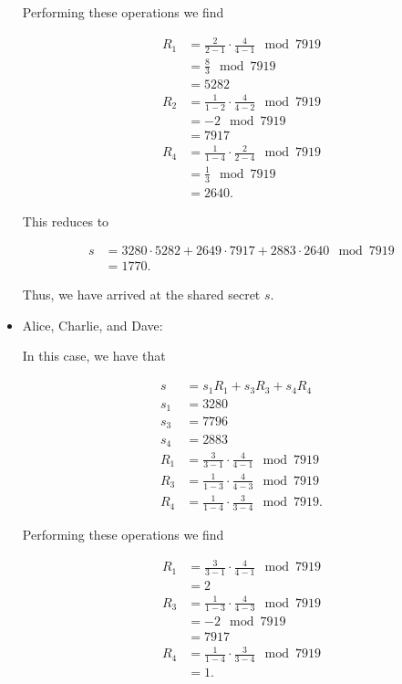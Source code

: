 \begin{example}
\begin{itemize}
\noindent
Performing these operations we find

\begin{align}
    R_{1} &= \frac{2}{2-1}\cdot\frac{4}{4-1} \mod 7919 \nonumber\\
        &= \frac{8}{3} \mod 7919 \nonumber\\
        &= 5282 \nonumber\\
    R_{2} &= \frac{1}{1-2}\cdot\frac{4}{4-2} \mod 7919 \nonumber\\
        &= -2 \mod 7919 \nonumber\\
        &= 7917 \nonumber\\
    R_{4} &= \frac{1}{1-4}\cdot\frac{2}{2-4} \mod 7919 \nonumber\\
        &= \frac{1}{3} \mod 7919 \nonumber\\
        &= 2640.
\end{align}

\noindent
This reduces to

\begin{align}
    s &= 3280\cdot5282 + 2649\cdot7917 + 2883\cdot2640 \mod 7919
        \nonumber\\
    &= 1770.
\end{align}

\noindent
Thus, we have arrived at the \gls{shared secret} $s$.

\item Alice, Charlie, and Dave:

In this case, we have that

\begin{align}
    s &= s_{1}R_{1} + s_{3}R_{3} + s_{4}R_{4} \nonumber\\
    s_{1} &= 3280 \nonumber\\
    s_{3} &= 7796 \nonumber\\
    s_{4} &= 2883 \nonumber\\
    R_{1} &= \frac{3}{3-1}\cdot\frac{4}{4-1} \mod 7919 \nonumber\\
    R_{3} &= \frac{1}{1-3}\cdot\frac{4}{4-3} \mod 7919 \nonumber\\
    R_{4} &= \frac{1}{1-4}\cdot\frac{3}{3-4} \mod 7919.
\end{align}

\noindent
Performing these operations we find

\begin{align}
    R_{1} &= \frac{3}{3-1}\cdot\frac{4}{4-1} \mod 7919 \nonumber\\
        &= 2 \nonumber\\
    R_{3} &= \frac{1}{1-3}\cdot\frac{4}{4-3} \mod 7919 \nonumber\\
        &= -2 \mod 7919 \nonumber\\
        &= 7917 \nonumber\\
    R_{4} &= \frac{1}{1-4}\cdot\frac{3}{3-4} \mod 7919 \nonumber\\
        &= 1.
\end{align}


\end{itemize}
\end{example}
